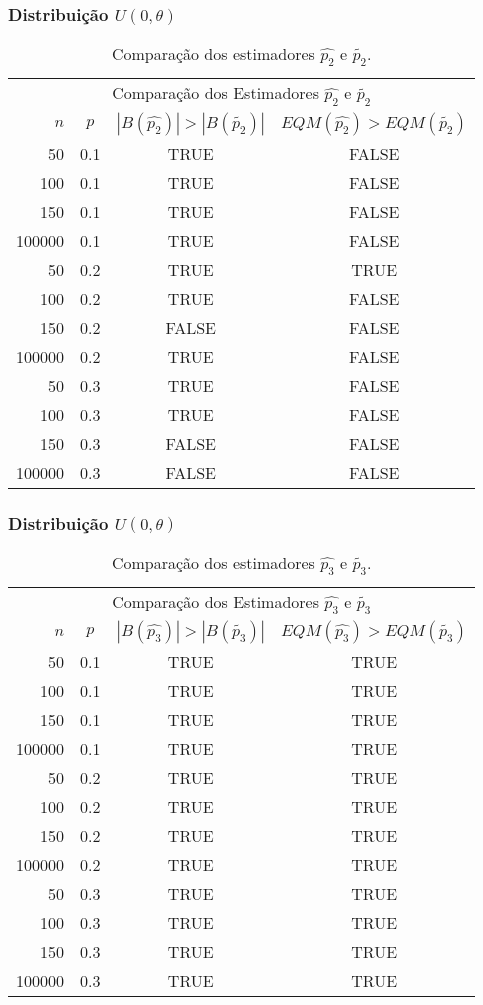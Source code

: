 \begin{frame}
\frametitle{Distribuição $U(0,\theta)$}
\tiny
\begin{table}[h]
\caption{Comparação dos estimadores $\hat{p_{2}}$ e $\tilde{p_{2}}$.}
\label{tab:p2}
\centering
\begin{tabular}{rccc}
\toprule
\multicolumn{4}{c}{Comparação dos Estimadores $\hat{p_{2}}$ e $\tilde{p_{2}}$}\\
$n$ & $p$ & $|B(\hat{p_{2}})|>|B(\tilde{p_{2}})|$ & $EQM(\hat{p_{2}})>EQM(\tilde{p_{2}})$ \\
\midrule
50 & 0.1 & TRUE & FALSE \\
100 & 0.1 & TRUE & FALSE \\
150 & 0.1 & TRUE & FALSE \\
100000 & 0.1 & TRUE & FALSE \\
\midrule
50 & 0.2 & TRUE & TRUE \\
100 & 0.2 & TRUE & FALSE \\
150 & 0.2 & FALSE & FALSE\\
100000 & 0.2 & TRUE & FALSE \\
\midrule
50 & 0.3 & TRUE & FALSE \\
100 & 0.3 & TRUE & FALSE \\
150 & 0.3 & FALSE & FALSE \\
100000 & 0.3 & FALSE & FALSE \\
\bottomrule
\end{tabular}
\end{table}
\end{frame}

\begin{frame}
\frametitle{Distribuição $U(0,\theta)$}
\tiny
\begin{table}[h]
\caption{Comparação dos estimadores $\hat{p_{3}}$ e $\tilde{p_{3}}$.}
\label{tab:p2}
\centering
\begin{tabular}{rccc}
\toprule
\multicolumn{4}{c}{Comparação dos Estimadores $\hat{p_{3}}$ e $\tilde{p_{3}}$}\\
$n$ & $p$ & $|B(\hat{p_{3}})|>|B(\tilde{p_{3}})|$ & $EQM(\hat{p_{3}})>EQM(\tilde{p_{3}})$ \\
\midrule
50 & 0.1 & TRUE & TRUE \\
100 & 0.1 & TRUE & TRUE \\
150 & 0.1 & TRUE & TRUE \\
100000 & 0.1 & TRUE & TRUE \\
\midrule
50 & 0.2 & TRUE & TRUE \\
100 & 0.2 & TRUE & TRUE \\
150 & 0.2 & TRUE & TRUE \\
100000 & 0.2 & TRUE & TRUE \\
\midrule
50 & 0.3 & TRUE & TRUE \\
100 & 0.3 & TRUE & TRUE \\
150 & 0.3 & TRUE & TRUE \\
100000 & 0.3 & TRUE & TRUE \\
\bottomrule
\end{tabular}
\end{table}
\end{frame}